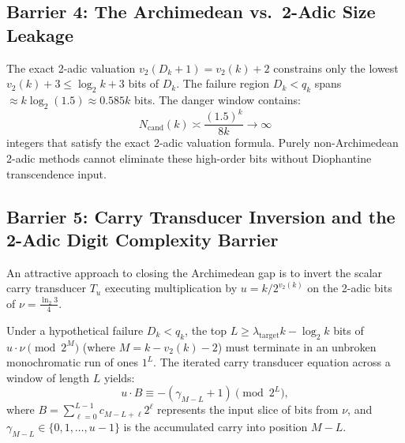 \documentclass[11pt,reqno]{amsart}
\theoremstyle{definition}
\numberwithin{equation}{section}
\begin{document}
\subsection{Barrier 4: The Archimedean vs.\ 2-Adic Size Leakage}
The exact 2-adic valuation $v_2(D_k + 1) = v_2(k) + 2$ constrains only the lowest $v_2(k) + 3 \le \log_2 k + 3$ bits of $D_k$.
The failure region $D_k < q_k$ spans $\approx k \log_2(1.5) \approx 0.585 k$ bits.
The danger window contains:
\begin{equation}
N_{\mathrm{cand}}(k) \asymp \frac{(1.5)^k}{8k} \to \infty
\end{equation}
integers that satisfy the exact 2-adic valuation formula. Purely non-Archimedean 2-adic methods cannot eliminate these high-order bits without Diophantine transcendence input.

\subsection{Barrier 5: Carry Transducer Inversion and the 2-Adic Digit Complexity Barrier}
An attractive approach to closing the Archimedean gap is to invert the scalar carry transducer $T_u$ executing multiplication by $u = k / 2^{v_2(k)}$ on the 2-adic bits of $\nu = \frac{\ln_2 3}{4}$.

Under a hypothetical failure $D_k < q_k$, the top $L \ge \lambda_{\mathrm{target}} k - \log_2 k$ bits of $u \cdot \nu \pmod{2^M}$ (where $M = k - v_2(k) - 2$) must terminate in an unbroken monochromatic run of ones $1^L$. The iterated carry transducer equation across a window of length $L$ yields:
\begin{equation}\label{eq:transducer_inversion}
u \cdot B \equiv -(\gamma_{M-L} + 1) \pmod{2^L},
\end{equation}
where $B = \sum_{\ell=0}^{L-1} c_{M-L+\ell} 2^\ell$ represents the input slice of bits from $\nu$, and $\gamma_{M-L} \in \{0, 1, \dots, u-1\}$ is the accumulated carry into position $M - L$.
\end{document}

